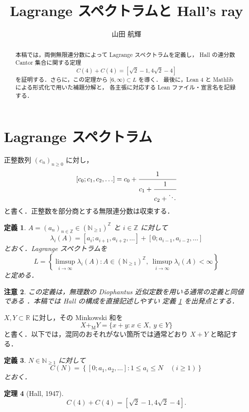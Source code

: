 \documentclass[10pt,a4paper]{ujarticle}
\author{山田 航輝}
\title{Lagrange スペクトラムと Hall's ray}
\newtheorem{theorem}{定理}
\newtheorem{definition}[theorem]{定義}
\newtheorem{remark}[theorem]{注意}
\newcommand{\Npos}{\mathbb{N}_{\ge 1}}
\newcommand{\Mink}{\mathbin{+_{\mathrm M}}}
\begin{document}
\maketitle

\begin{abstract}
本稿では，両側無限連分数によって Lagrange スペクトラムを定義し，
Hall の連分数 Cantor 集合に関する定理
\[
  C(4)+C(4)=[\sqrt2-1,4\sqrt2-4]
\]
を証明する．さらに，この定理から $[6,\infty)\subset L$ を導く．
最後に，Lean 4 と Mathlib による形式化で用いた補題分解と，
各主張に対応する Lean ファイル・宣言名を記録する．
\end{abstract}

\section{Lagrange スペクトラム}

正整数列 $(c_n)_{n\ge 0}$ に対し，
\[
  [c_0;c_1,c_2,\ldots]
  =c_0+\cfrac1{c_1+\cfrac1{c_2+\ddots}}
\]
と書く．正整数を部分商とする無限連分数は収束する．

\begin{definition}
\label{def:lagrange-spectrum}
$A=(a_n)_{n\in\mathbb Z}\in(\Npos)^{\mathbb Z}$ と $i\in\mathbb Z$ に対して
\[
  \lambda_i(A)
  =[a_i;a_{i+1},a_{i+2},\ldots]
   +[0;a_{i-1},a_{i-2},\ldots]
\]
とおく．Lagrange スペクトラムを
\[
  L=
  \left\{
    \limsup_{i\to\infty}\lambda_i(A):
    A\in(\Npos)^{\mathbb Z},\
    \limsup_{i\to\infty}\lambda_i(A)<\infty
  \right\}
\]
と定める．
\end{definition}

\begin{remark}
この定義は，無理数の Diophantus 近似定数を用いる通常の定義と同値である
\cite[Chapter~1]{cusick}．本稿では Hall の構成を直接記述しやすい
定義 \ref{def:lagrange-spectrum} を出発点とする．
\end{remark}

$X,Y\subset\mathbb R$ に対し，その Minkowski 和を
\[
  X\Mink Y=\{x+y:x\in X,\ y\in Y\}
\]
と書く．以下では，混同のおそれがない箇所では通常どおり $X+Y$ と略記する．

\begin{definition}
$N\in\Npos$ に対して
\[
  C(N)=
  \left\{
    [0;a_1,a_2,\ldots]:1\le a_i\le N\quad(i\ge1)
  \right\}
\]
とおく．
\end{definition}

\begin{theorem}[Hall, 1947]
\label{theorem:C4}
\[
  C(4)+C(4)=[\sqrt2-1,4\sqrt2-4].
\]
\end{theorem}
\end{document}
